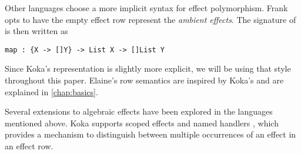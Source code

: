 Other languages choose a more implicit syntax for effect polymorphism. Frank \autocite{lindley_be_2017} opts to have the empty effect row represent the \emph{ambient effects}. The signature of  is then written as
\begin{lstlisting}[language={},style=fancy]
map : {X -> []Y} -> List X -> []List Y
\end{lstlisting}
Since Koka's representation is slightly more explicit, we will be using that style throughout this paper. Elaine's row semantics are inspired by Koka's and are explained in \cref{chap:basics}.

Several extensions to algebraic effects have been explored in the languages mentioned above. Koka supports scoped effects and named handlers \autocite{xie_first-class_2022}, which provides a mechanism to distinguish between multiple occurrences of an effect in an effect row.
